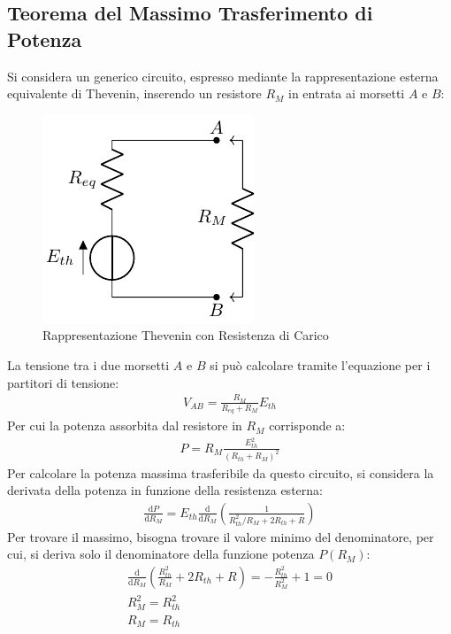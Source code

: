 \documentclass{article}
\newcommand{\df}{\mathrm{d}}
\numberwithin{equation}{subsection}
\begin{document}
\subsection{Teorema del Massimo Trasferimento di Potenza}

Si considera un generico circuito, espresso mediante la rappresentazione esterna equivalente di Thevenin, inserendo un resistore $R_M$ in entrata ai morsetti $A$ e $B$:
\begin{figure}[H]%
    \centering
    \includegraphics{rappresentazione-thevenin-carico.pdf}
    \caption{Rappresentazione Thevenin con Resistenza di Carico}
    \label{fig:rappresentazione-thevenin-carico}
\end{figure}
La tensione tra i due morsetti $A$ e $B$ si può calcolare tramite l'equazione per i partitori di tensione:
\begin{gather*}
    V_{AB}=\displaystyle\frac{R_M}{R_{eq}+R_M}E_{th}
\end{gather*}
Per cui la potenza assorbita dal resistore in $R_M$ corrisponde a:
\begin{gather*}
    P=R_M\displaystyle\frac{E_{th}^2}{(R_{th}+R_M)^2}
\end{gather*}
Per calcolare la potenza massima trasferibile da questo circuito, si considera la derivata della potenza in funzione della resistenza esterna:
\begin{gather*}
    \displaystyle\frac{\df P}{\df R_M}=E_{th}\frac{\df}{\df R_M}\left(\frac{1}{{R_{th}^2}/{R_M}+2R_{th}+R}\right)
\end{gather*}
Per trovare il massimo, bisogna trovare il valore minimo del denominatore, per cui, si deriva solo il denominatore della funzione potenza $P(R_M)$:
\begin{gather*}
    \displaystyle\frac{\df}{\df R_M}\left(\frac{R_{th}^2}{R_M}+2R_{th}+R\right)=-\frac{R_{th}^2}{R_M^2}+1=0\\
    R_M^2=R_{th}^2\\
    R_M=R_{th}
\end{gather*}
\end{document}

